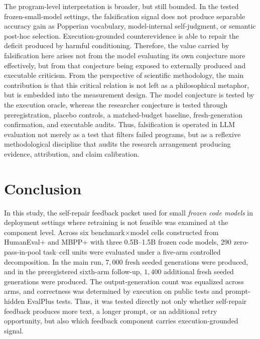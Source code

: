 \documentclass{article}
\numberwithin{equation}{section}  %
\theoremstyle{definition}
\begin{document}
The program-level interpretation is broader, but still bounded. In the tested
frozen-small-model settings, the falsification signal does not produce separable accuracy gain
as Popperian vocabulary, model-internal self-judgment, or semantic post-hoc selection.
Execution-grounded counterevidence is able to repair the deficit produced by harmful
conditioning. Therefore, the value carried by falsification here arises not from the model
evaluating its own conjecture more effectively, but from that conjecture being exposed to
externally produced and executable criticism. From the perspective of scientific methodology,
the main contribution is that this critical relation is not left as a philosophical metaphor,
but is embedded into the measurement design. The model conjecture is tested by the execution
oracle, whereas the researcher conjecture is tested through preregistration, placebo controls,
a matched-budget baseline, fresh-generation confirmation, and executable audits. Thus,
falsification is operated in LLM evaluation not merely as a test that filters failed programs,
but as a reflexive methodological discipline that audits the research arrangement producing
evidence, attribution, and claim calibration.

\section{Conclusion}
\label{sec:conclusion}

In this study, the self-repair feedback packet used for small \emph{frozen code models} in
deployment settings where retraining is not feasible was examined at the component level.
Across six benchmark$\times$model cells constructed from HumanEval+ and MBPP+ with three
0.5B--1.5B frozen code models, 290 zero-pass-in-pool task--cell units were evaluated under a
five-arm controlled decomposition. In the main run, $7{,}000$ fresh seeded generations were
produced, and in the preregistered sixth-arm follow-up, $1{,}400$ additional fresh seeded
generations were produced. The output-generation count was equalized across arms, and
correctness was determined by execution on public tests and prompt-hidden EvalPlus tests.
Thus, it was tested directly not only whether self-repair feedback produces more text, a
longer prompt, or an additional retry opportunity, but also which feedback component carries
execution-grounded signal.
\end{document}
